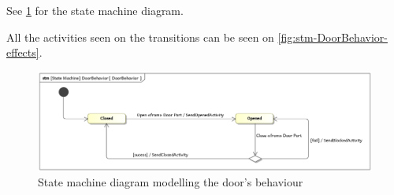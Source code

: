 \documentclass[a4paper]{article}
\begin{document}
See \cref{fig:stm-DoorBehavior} for the state machine diagram.

All the activities seen on the transitions can be seen on
\cref{fig:stm-DoorBehavior-effects}.

\begin{figure}[p]
	\includegraphics[width=\textwidth]{stm-DoorBehavior.jpg}
	\caption{State machine diagram modelling the door's behaviour}%
	\label{fig:stm-DoorBehavior}
\end{figure}
\end{document}
